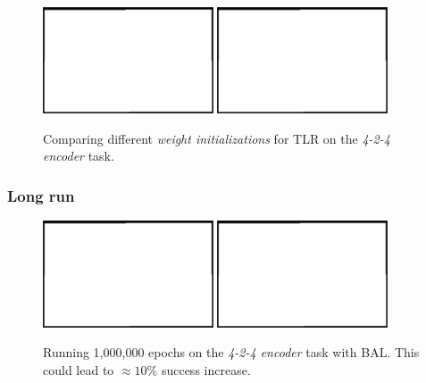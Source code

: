 \begin{figure}[H]
  \centering
  \includegraphics[width=0.45\textwidth]{img/placeholder.png}  %
  \includegraphics[width=0.45\textwidth]{img/placeholder.png}  %
  \caption{Comparing different \emph{weight initializations} for TLR on the \emph{4-2-4 encoder} task.}
  \label{fig:results-tlr-auto4-sigma}
\end{figure}

\subsubsection{Long run} 
\label{sec:results-long-run} 

\begin{figure}[H]
  \centering
  \includegraphics[width=0.45\textwidth]{img/placeholder.png}  %
  \includegraphics[width=0.45\textwidth]{img/placeholder.png}  %
  \caption{Running 1,000,000 epochs on the \emph{4-2-4 encoder} task with BAL. This could lead to $\approx 10\%$ success increase.}
  \label{fig:results-tlr-auto4-long-run}
\end{figure}



 
